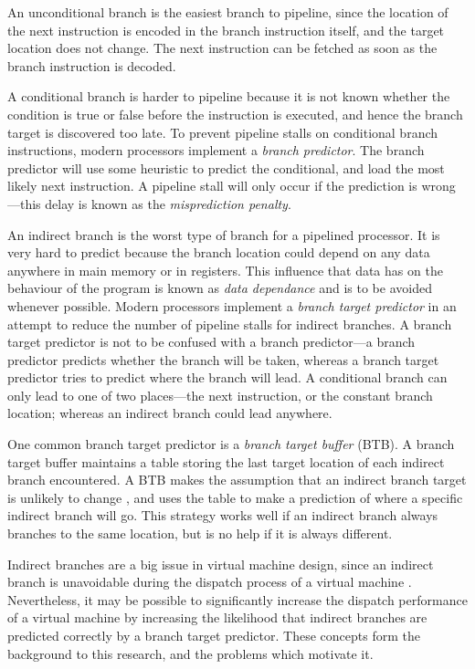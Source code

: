 			An unconditional branch is the easiest branch to pipeline, since the location of the next instruction is encoded in the branch instruction itself, and the target location does not change. The next instruction can be fetched as soon as the branch instruction is decoded. 
			
			A conditional branch is harder to pipeline because it is not known whether the condition is true or false before the instruction is executed, and hence the branch target is discovered too late. To prevent pipeline stalls on conditional branch instructions, modern processors implement a \emph{branch predictor}. The branch predictor will use some heuristic to predict the conditional, and load the most likely next instruction. A pipeline stall will only occur if the prediction is wrong---this delay is known as the \emph{misprediction penalty}.
			
			An indirect branch is the worst type of branch for a pipelined processor. It is very hard to predict because the branch location could depend on any data anywhere in main memory or in registers. This influence that data has on the behaviour of the program is known as \emph{data dependance} and is to be avoided whenever possible. Modern processors implement a \emph{branch target predictor} in an attempt to reduce the number of pipeline stalls for indirect branches. A branch target predictor is not to be confused with a branch predictor---a branch predictor predicts whether the branch will be taken, whereas a branch target predictor tries to predict where the branch will lead. A conditional branch can only lead to one of two places---the next instruction, or the constant branch location; whereas an indirect branch could lead anywhere.
			
			One common branch target predictor is a \emph{branch target buffer} (BTB). A branch target buffer maintains a table storing the last target location of each indirect branch encountered. A BTB makes the assumption that an indirect branch target is unlikely to change  \citep{yeti}, and uses the table to make a prediction of where a specific indirect branch will go. This strategy works well if an indirect branch always branches to the same location, but is no help if it is always different.
			
			Indirect branches are a big issue in virtual machine design, since an indirect branch is unavoidable during the dispatch process of a virtual machine \citep{structureinterpreters}. Nevertheless, it may be possible to significantly increase the dispatch performance of a virtual machine by increasing the likelihood that indirect branches are predicted correctly by a branch target predictor. These concepts form the background to this research, and the problems which motivate it.
	
